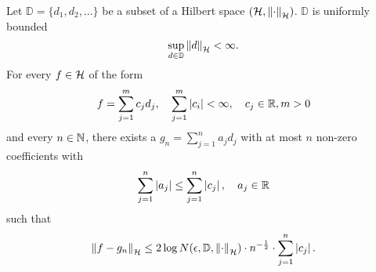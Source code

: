 \begin{theorem}
    \label{thm:maurey}
    Let $\mathbb{D} = \{d_1, d_2, \dots\}$ be a subset of a Hilbert space
    $(\mathcal{H}, \left\| \cdot \right\|_{\mathcal{H}})$. $\mathbb{D}$ is uniformly bounded
    \begin{equation}
        \sup_{d\in\mathbb{D}} \left\| d \right\|_{\mathcal{H}} < \infty.
    \end{equation}
    For every $f \in \mathcal{H}$ of the form
    \begin{equation}
        \label{eq:maurey_eq_1}
        f = \sum_{j=1}^m c_j d_j, \quad
        \sum_{j=1}^m \left| c_i \right| < \infty, \quad
        c_j \in \mathbb{R}, m > 0
    \end{equation}
    and every $n \in \mathbb{N}$, there exists a $g_n = \sum_{j=1}^n a_j
    d_j$ with at most $n$ non-zero coefficients with
    \begin{equation}
        \sum_{j=1}^n \left| a_j \right| \leq
        \sum_{j=1}^n \left| c_j \right|, 
        \quad a_j \in \mathbb{R}
    \end{equation}
    such that
    \begin{equation}
        \left\| f - g_n \right\|_{\mathcal{H}} \leq
        2 \log N(\epsilon, \mathbb{D}, \left\| \cdot \right\|_{\mathcal{H}})
        \cdot n^{-\frac{1}{2}}
        \cdot \sum_{j=1}^n \left| c_j \right|.
    \end{equation}

\end{theorem}

